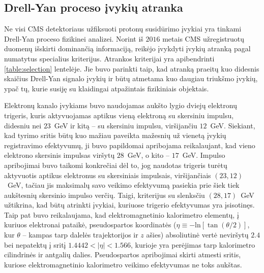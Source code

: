 \documentclass[a4paper, 12pt, oneside]{article}
\newlength\q
\begin{document}
\subsection{Drell-Yan proceso įvykių atranka}\label{sec:selection}
Ne visi CMS detektoriaus užfiksuoti protonų susidūrimo įvykiai yra tinkami Drell-Yan proceso fizikinei analizei.
Norint iš $2016$ metais CMS užregistruotų duomenų išskirti dominančią informaciją, reikėjo įvykdyti įvykių atranką pagal
numatytus specialius kriterijus.
Atrankos kriterijai yra apibendrinti \ref{table:selection} lentelėje.
Jie buvo parinkti taip, kad atranką praeitų kuo didesnis skaičius Drell-Yan signalo įvykių ir būtų atmetama kuo daugiau
triukšmo įvykių, ypač tų, kurie susiję su klaidingai atpažintais fizikiniais objektais.

Elektronų kanalo įvykiams buvo naudojamas aukšto lygio dviejų elektronų trigeris, kuris aktyvuojamas aptikus vieną elektroną
su skersiniu impulsu, didesniu nei $23$~GeV ir kitą -- su skersiniu impulsu, viršijančiu $12$~GeV.
Siekiant, kad tyrimo sritis būtų kuo mažiau paveikta mažesnių už vienetą įvykių registravimo efektyvumų, ji buvo papildomai
apribojama reikalaujant, kad vieno elektrono skersinis impulsas viršytų $28$~GeV, o kito -- $17$~GeV.
Impulso apribojimai buvo taikomi konkrečiai dėl to, jog naudotas trigeris turėtų aktyvuotis aptikus elektronus
su skersiniais impulsais, viršijančiais $(23, 12)$~GeV, tačiau jis maksimalų savo veikimo efektyvumą pasiekia prie šiek
tiek aukštesnių skersinio impulso verčių.
Taigi, kriterijus su slenksčiu $(28, 17)$~GeV užtikrina, kad būtų atrinkti įvykiai, kuriuose trigerio efektyvumas yra
įsisotinęs.
Taip pat buvo reikalaujama, kad elektromagnetinio kalorimetro elementų, į kuriuos elektronai pataikė, pseudospartos koordinatės
($\eta\equiv -\mathrm{ln}\left[\tan\left(\theta/2\right)\right]$, kur $\theta$ -- kampas tarp dalelės trajektorijos ir $z$ ašies)
absoliutinė vertė neviršytų $2.4$ bei nepatektų į sritį $1.4442<|\eta|<1.566$, kurioje yra perėjimas tarp kalorimetro
cilindrinės ir antgalių dalies.
Pseudospartos apribojimai skirti atmesti sritis, kuriose elektromagnetinio kalorimetro veikimo efektyvumas ne toks
aukštas.
\end{document}
